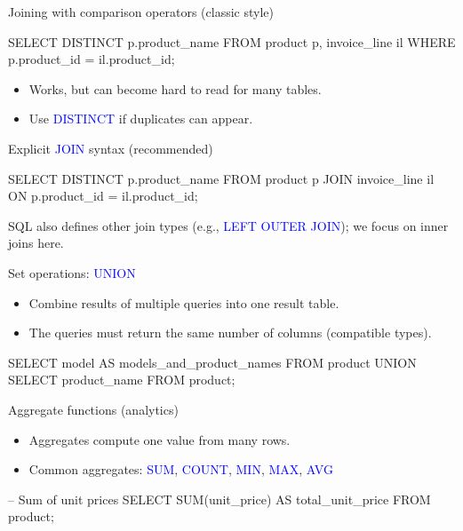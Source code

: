 \documentclass[10pt,aspectratio=169]{beamer}
\newcommand{\sqlk}[1]{\textcolor{blue}{#1}}
\begin{document}
\begin{frame}[fragile]{Joining with comparison operators (classic style)}
\begin{codesql}
SELECT DISTINCT p.product_name
FROM   product p, invoice_line il
WHERE  p.product_id = il.product_id;
\end{codesql}
\vspace{0.4em}
\begin{itemize}
  \item Works, but can become hard to read for many tables.
  \item Use \sqlk{DISTINCT} if duplicates can appear.
\end{itemize}
\end{frame}

\begin{frame}[fragile]{Explicit \sqlk{JOIN} syntax (recommended)}
\begin{codesql}
SELECT DISTINCT p.product_name
FROM   product p
JOIN   invoice_line il
       ON p.product_id = il.product_id;
\end{codesql}
\vspace{0.6em}
\small SQL also defines other join types (e.g., \sqlk{LEFT OUTER JOIN}); we focus on inner joins here.
\end{frame}

\begin{frame}[fragile]{Set operations: \sqlk{UNION}}
\begin{itemize}
  \item Combine results of multiple queries into one result table.
  \item The queries must return the same number of columns (compatible types).
\end{itemize}
\vspace{0.6em}
\begin{codesql}
SELECT model AS models_and_product_names
FROM   product
UNION
SELECT product_name
FROM   product;
\end{codesql}
\end{frame}

\begin{frame}[fragile]{Aggregate functions (analytics)}
\begin{itemize}
  \item Aggregates compute one value from many rows.
  \item Common aggregates: \sqlk{SUM}, \sqlk{COUNT}, \sqlk{MIN}, \sqlk{MAX}, \sqlk{AVG}
\end{itemize}
\vspace{0.6em}
\begin{codesql}
-- Sum of unit prices
SELECT SUM(unit_price) AS total_unit_price
FROM   product;
\end{codesql}
\end{frame}
\end{document}
